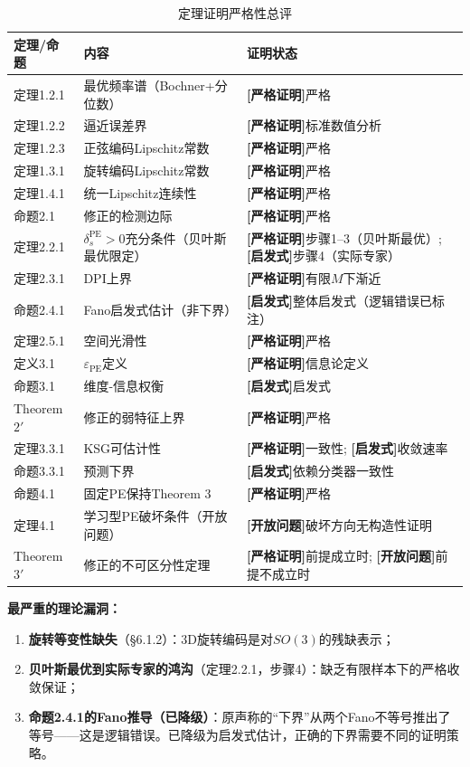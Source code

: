\documentclass[11pt,a4paper]{article}
\theoremstyle{remark}
\DeclareMathOperator{\PE}{PE}
\newcommand{\rigorous}{\textnormal{\textbf{[严格证明]}}}
\newcommand{\heuristic}{\textnormal{\textbf{[启发式]}}}
\newcommand{\openproblem}{\textnormal{\textbf{[开放问题]}}}
\begin{document}
\begin{table}[htbp]
\centering
\caption{定理证明严格性总评}
\label{tab:honesty}
\begin{tabular}{@{}lll@{}}
\toprule
\textbf{定理/命题} & \textbf{内容} & \textbf{证明状态} \\
\midrule
定理1.2.1 & 最优频率谱（Bochner+分位数） & \rigorous 严格 \\
定理1.2.2 & 逼近误差界 & \rigorous 标准数值分析 \\
定理1.2.3 & 正弦编码Lipschitz常数 & \rigorous 严格 \\
定理1.3.1 & 旋转编码Lipschitz常数 & \rigorous 严格 \\
定理1.4.1 & 统一Lipschitz连续性 & \rigorous 严格 \\
\midrule
命题2.1 & 修正的检测边际 & \rigorous 严格 \\
定理2.2.1 & $\delta_s^{\PE}>0$充分条件（贝叶斯最优限定） & \rigorous 步骤1--3（贝叶斯最优）; \heuristic 步骤4（实际专家） \\
定理2.3.1 & DPI上界 & \rigorous 有限$M$下渐近 \\
命题2.4.1 & Fano启发式估计（非下界） & \heuristic 整体启发式（逻辑错误已标注） \\
定理2.5.1 & 空间光滑性 & \rigorous 严格 \\
\midrule
定义3.1 & $\varepsilon_{\PE}$定义 & \rigorous 信息论定义 \\
命题3.1 & 维度-信息权衡 & \heuristic 启发式 \\
Theorem $2'$ & 修正的弱特征上界 & \rigorous 严格 \\
定理3.3.1 & KSG可估计性 & \rigorous 一致性; \heuristic 收敛速率 \\
命题3.3.1 & 预测下界 & \heuristic 依赖分类器一致性 \\
\midrule
命题4.1 & 固定PE保持Theorem 3 & \rigorous 严格 \\
定理4.1 & 学习型PE破坏条件（开放问题） & \openproblem 破坏方向无构造性证明 \\
Theorem $3'$ & 修正的不可区分性定理 & \rigorous 前提成立时; \openproblem 前提不成立时 \\
\bottomrule
\end{tabular}
\end{table}

\textbf{最严重的理论漏洞：}
\begin{enumerate}[label=(\arabic*)]
    \item \textbf{旋转等变性缺失}（\S6.1.2）：3D旋转编码是对$SO(3)$的残缺表示；
    \item \textbf{贝叶斯最优到实际专家的鸿沟}（定理2.2.1，步骤4）：缺乏有限样本下的严格收敛保证；
    \item \textbf{命题2.4.1的Fano推导（已降级）}：原声称的``下界''从两个Fano不等号推出了等号——这是逻辑错误。已降级为启发式估计，正确的下界需要不同的证明策略。
\end{enumerate}
\end{document}
